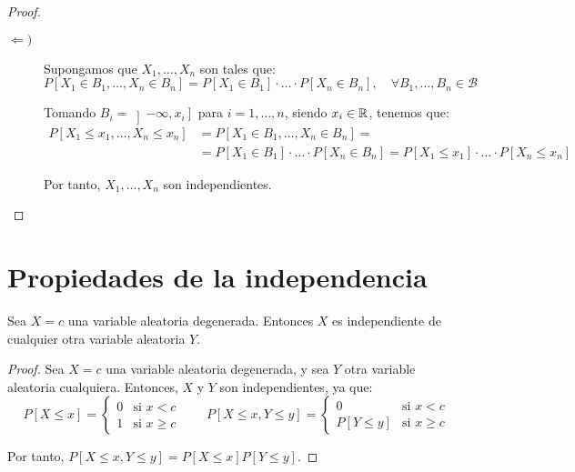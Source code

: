 \begin{proof}
\begin{description}
        \item[$\Longleftarrow)$] Supongamos que $X_1, \ldots, X_n$ son tales que:
        \begin{equation*}
            P[X_1 \in B_1, \ldots, X_n \in B_n] = P[X_1 \in B_1] \cdot \ldots \cdot P[X_n \in B_n], \quad \forall B_1, \ldots, B_n \in \mathcal{B}
        \end{equation*}

        Tomando $B_i=\left]-\infty, x_i\right]$ para $i=1,\dots,n$, siendo $x_i\in \mathbb{R}$,
        tenemos que:
        \begin{align*}
            P[X_1 \leq x_1, \ldots, X_n \leq x_n] &= P[X_1 \in B_1, \ldots, X_n \in B_n]
            =\\&= P[X_1 \in B_1] \cdot \ldots \cdot P[X_n \in B_n]
            = P[X_1 \leq x_1] \cdot \ldots \cdot P[X_n \leq x_n]
        \end{align*}

        Por tanto, $X_1, \ldots, X_n$ son independientes.
    \end{description}
\end{proof}

\section{Propiedades de la independencia}

\begin{prop}
    Sea $X=c$ una variable aleatoria degenerada. Entonces $X$ es independiente de cualquier otra variable aleatoria $Y$.
\end{prop}
\begin{proof}
    Sea $X=c$ una variable aleatoria degenerada, y sea $Y$ otra variable aleatoria cualquiera. Entonces, $X$ y $Y$ son independientes, ya que:
    \begin{equation*}
        P[X\leq x] = \begin{cases}
            0 & \text{si } x< c \\
            1 & \text{si } x\geq c
        \end{cases}
        \qquad
        P[X\leq x, Y\leq y] = \begin{cases}
            0 & \text{si } x< c \\
            P[Y\leq y] & \text{si } x\geq c
        \end{cases}
    \end{equation*}

    Por tanto, $P[X\leq x, Y\leq y] = P[X\leq x]P[Y\leq y]$.
\end{proof}

